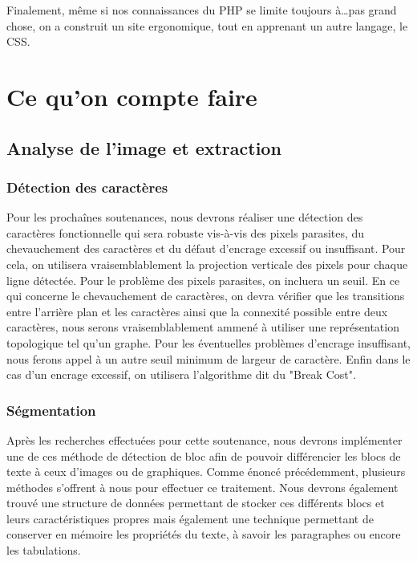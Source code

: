\documentclass[]{report}
\begin{document}
		Finalement, même si nos connaissances du PHP se limite toujours à\ldots pas grand chose, on a construit un site ergonomique, tout en apprenant un autre langage, le CSS.




\part{Ce qu'on compte faire} %
\label{prt:ce_qu_on_compte_faire}

	\chapter{Analyse de l'image et extraction} %
	\label{cha:analyse_de_l'image_et_extraction}

    \section{D\'etection des caractères} %
    \label{sec:d'etection_des_caractères}
      Pour les prochaînes soutenances, nous devrons réaliser une détection des caractères fonctionnelle qui sera robuste vis-à-vis des pixels parasites, du chevauchement des caractères et du défaut d'encrage excessif ou insuffisant. Pour cela, on utilisera vraisemblablement la projection verticale des pixels pour chaque ligne détectée. Pour le problème des pixels parasites, on incluera un seuil. En ce qui concerne le  chevauchement de caractères, on devra vérifier que les transitions entre l'arrière plan et les caractères ainsi que la connexité possible entre deux caractères, nous serons vraisemblablement ammené à utiliser une représentation topologique tel qu'un graphe. Pour les éventuelles problèmes d'encrage insuffisant, nous ferons appel à un autre seuil minimum de largeur de caractère. Enfin dans le cas d'un encrage excessif, on utilisera l'algorithme dit du "Break Cost".


    \section{S\'egmentation} %
    \label{sec:s\'egmentation}
  		Après les recherches effectuées pour cette soutenance, nous devrons implémenter une de ces méthode de détection de bloc afin de pouvoir différencier les blocs de texte à ceux d'images ou de graphiques. Comme énoncé précédemment, plusieurs méthodes s'offrent à nous pour effectuer ce traitement. Nous devrons également trouvé une structure de données permettant de stocker ces différents blocs et leurs caractéristiques propres mais également une technique permettant de conserver en mémoire les propriétés du texte, à savoir les paragraphes ou encore les tabulations.







 
\end{document}
